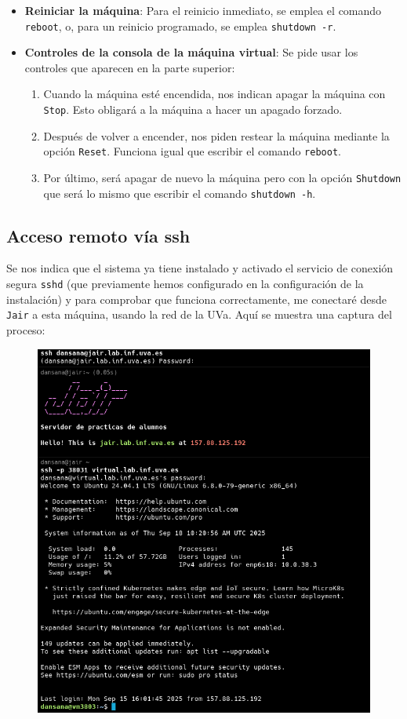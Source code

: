 \documentclass[10pt]{article}
\begin{document}
\begin{itemize}
		\item \textbf{Reiniciar la máquina}: Para el reinicio inmediato, se emplea el comando \verb|reboot|, o, para un reinicio programado, se emplea \verb|shutdown -r|.
		\item \textbf{Controles de la consola de la máquina virtual}: Se pide usar los controles que aparecen en la parte superior:
		\begin{enumerate}
			\item Cuando la máquina esté encendida, nos indican apagar la máquina con \verb|Stop|. Esto obligará a la máquina a hacer un apagado forzado.
			\item Después de volver a encender, nos piden restear la máquina mediante la opción \verb|Reset|. Funciona igual que escribir el comando \verb|reboot|.
			\item Por último, será apagar de nuevo la máquina pero con la opción \verb|Shutdown| que será lo mismo que escribir el comando \verb|shutdown -h|.
		\end{enumerate}
	\end{itemize}
	
	\subsection{Acceso remoto vía ssh}
	Se nos indica que el sistema ya tiene instalado y activado el servicio de conexión segura \verb|sshd| (que previamente hemos configurado en la configuración de la instalación) y para comprobar que funciona correctamente, me conectaré desde \verb|Jair| a esta máquina, usando la red de la UVa. Aquí se muestra una captura del proceso:
	\begin{figure}[H]
		\setlength{\abovecaptionskip}{0cm}
		\setlength{\belowcaptionskip}{0cm}
		\centering
		\includegraphics[width=0.6\linewidth]{Recursos/ssh.png}
	\end{figure}
	
\end{document}
